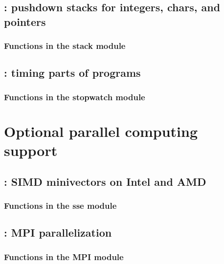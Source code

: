 \documentclass[10pt]{book}
\begin{document}
\newpage
\section{: pushdown stacks for integers, chars, and pointers}

\subsection{Functions in the stack module}


\newpage
\section{: timing parts of programs}

\subsection{Functions in the stopwatch module}




\newpage
\chapter{Optional parallel computing support}

\newpage
\section{: SIMD minivectors on Intel and AMD }

\subsection{Functions in the sse module}



\newpage
\section{: MPI parallelization}

\subsection{Functions in the MPI module}




\newpage
\end{document}
